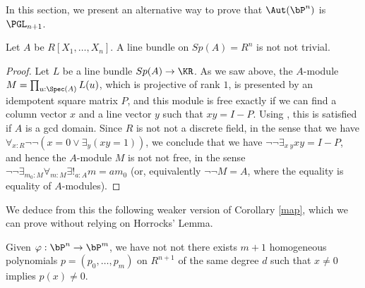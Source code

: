 In this section, we present an alternative way to prove that   $\Aut(\bP^n)$ is $\PGL_{n+1}$.

\begin{lemma}\label{notnot}
 Let $A$ be $R[X_1,\dots,X_n]$. A line bundle on $Sp(A) = R^n$ is not not trivial.
\end{lemma}

\begin{proof}
  Let $L$ be a line bundle $Sp(A)\rightarrow\KR$. As we saw above, the $A$-module $M = \prod_{u:\Spec(A)}L(u)$,
  which is projective of rank $1$,   is presented by an idempotent square matrix $P$, and this module is free
  exactly if we can find a column vector $x$ and a line vector $y$ such that $xy = I-P$. Using
  \cite{seminormal}, this is satisfied if $A$ is a gcd domain. Since $R$ is not not a discrete
  field, in the sense that we have $\forall_{x:R}\neg\neg (x=0 \vee \exists_y (xy = 1))$, we conclude
  that we have $\neg\neg \exists_{x~y}xy = I-P$, and hence the $A$-module  $M$
  is not not free, in the sense $\neg\neg \exists_{m_0:M}\forall_{m:M}\exists!_{a:A} m = am_0$
  (or, equivalently $\neg\neg M = A$, where the equality is equality of $A$-modules).
\end{proof}

We deduce from this the following weaker version of Corollary \ref{map}, which we can prove without relying
on Horrocks' Lemma.

\begin{lemma}\label{weakmap}
  Given $\varphi:\bP^n\rightarrow  \bP^m$, we have not not there exists
  $m+1$ homogeneous polynomials $p = (p_0,\dots,p_m)$ on $R^{n+1}$
  of the same   degree $d$ such that $x\neq 0$ implies $p(x)\neq 0$.
\end{lemma}


